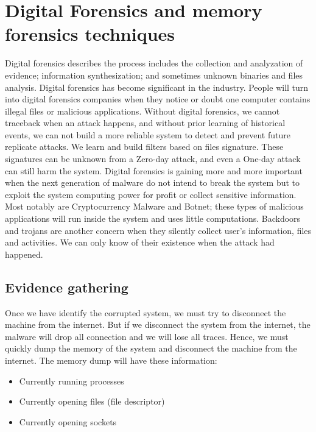 \section[Digital Forensics and memory forensics techniques]{Digital Forensics and memory forensics techniques}

Digital forensics describes the process includes the collection and analyzation of evidence; information synthesization; and sometimes unknown binaries and files analysis. Digital forensics has become significant in the industry. People will turn into digital forensics companies when they notice or doubt one computer contains illegal files or malicious applications. Without digital forensics, we cannot traceback when an attack happens, and without prior learning of historical events, we can not build a more reliable system to detect and prevent future replicate attacks. We learn and build filters based on files signature\cite{yararules}. These signatures can be unknown from a Zero-day attack, and even a One-day attack can still harm the system. Digital forensics is gaining more and more important when the next generation of malware do not intend to break the system but to exploit the system computing power for profit or collect sensitive information. Most notably are Cryptocurrency Malware and Botnet; these types of malicious applications will run inside the system and uses little computations. Backdoors and trojans are another concern when they silently collect user's information, files and activities. We can only know of their existence when the attack had happened.

\subsection[Evidence gathering]{Evidence gathering}

Once we have identify the corrupted system, we must try to disconnect the machine from the internet. But if we disconnect the system from the internet, the malware will drop all connection and we will lose all traces. Hence, we must quickly dump the memory of the system and disconnect the machine from the internet. The memory dump will have these information:

\begin{itemize}
\item Currently running processes
\item Currently opening files (file descriptor)
\item Currently opening sockets
\end{itemize}

